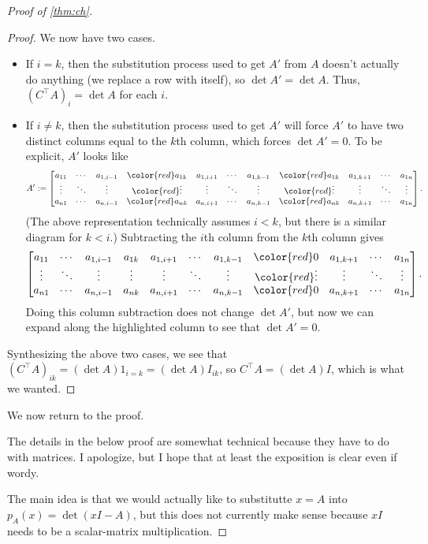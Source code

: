 \begin{proof}[Proof of \autoref{thm:ch}]
\begin{proof}
		We now have two cases.
		\begin{itemize}
			\item If $i=k$, then the substitution process used to get $A'$ from $A$ doesn't actually do anything (we replace a row with itself), so $\det A'=\det A$. Thus, $\left(C^\intercal A\right)_{i}=\det A$ for each $i$.
			\item If $i\ne k$, then the substitution process used to get $A'$ will force $A'$ to have two distinct columns equal to the $k$th column, which forces $\det A'=0$. To be explicit, $A'$ looks like
			\[A':=\left[\begin{array}{@{}*{11}{c}@{}}
				a_{11} & \cdots & a_{1,i-1} & \color{red}a_{1k} & a_{1,i+1} & \cdots & a_{1,k-1} & \color{red}a_{1k} & a_{1,k+1} & \cdots & a_{1n} \\
				\vdots & \ddots & \vdots & \color{red}\vdots & \vdots & \ddots & \vdots & \color{red}\vdots & \vdots & \ddots & \vdots \\
				a_{n1} & \cdots & a_{n,i-1} & \color{red}a_{nk} & a_{n,i+1} & \cdots & a_{n,k-1} & \color{red}a_{nk} & a_{n,k+1} & \cdots & a_{1n} \\
			\end{array}\right].\]
			(The above representation technically assumes $i<k$, but there is a similar diagram for $k<i$.) Subtracting the $i$th column from the $k$th column gives
			\[\left[\begin{array}{@{}*{11}{c}@{}}
				a_{11} & \cdots & a_{1,i-1} & a_{1k} & a_{1,i+1} & \cdots & a_{1,k-1} & \color{red}0 & a_{1,k+1} & \cdots & a_{1n} \\
				\vdots & \ddots & \vdots & \vdots & \vdots & \ddots & \vdots & \color{red}\vdots & \vdots & \ddots & \vdots \\
				a_{n1} & \cdots & a_{n,i-1} & a_{nk} & a_{n,i+1} & \cdots & a_{n,k-1} & \color{red}0 & a_{n,k+1} & \cdots & a_{1n} \\
			\end{array}\right].\]
			Doing this column subtraction does not change $\det A'$, but now we can expand along the highlighted column to see that $\det A'=0$.
		\end{itemize}
		Synthesizing the above two cases, we see that $(C^\intercal A)_{ik}=(\det A)1_{i=k}=(\det A)I_{ik}$, so $C^\intercal A=(\det A)I$, which is what we wanted.
	\end{proof}
	We now return to the proof.
	\begin{warn}
		The details in the below proof are somewhat technical because they have to do with matrices. I apologize, but I hope that at least the exposition is clear even if wordy.
	\end{warn}
	The main idea is that we would actually like to substitutte $x=A$ into $p_A(x)=\det(xI-A)$, but this does not currently make sense because $xI$ needs to be a scalar-matrix multiplication.
	

\end{proof}
